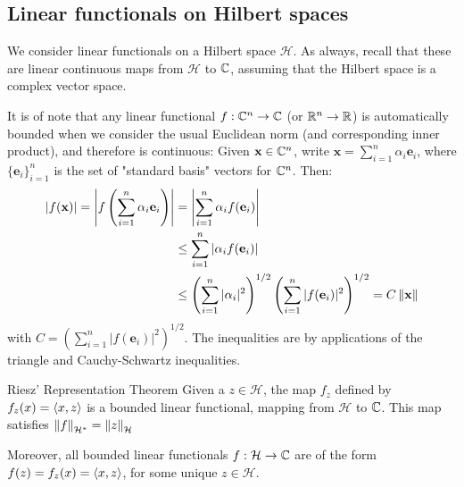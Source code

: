 \subsection{Linear functionals on Hilbert spaces}

We consider linear functionals on a Hilbert space $\mathcal{H}$. As always, recall that these are linear continuous maps from $\mathcal{H}$ to $\mathbb{C}$, assuming that the Hilbert space is a complex vector space.

It is of note that any linear functional $f: \mathbb{C}^{n} \to \mathbb{C}$ (or $\mathbb{R}^{n} \to \mathbb{R}$) is automatically bounded when we consider the usual Euclidean norm (and corresponding inner product), and therefore is continuous: Given $\mathbf{x}\in\mathbb{C}^{n}$, write $\mathbf{x} = \sum_{i=1}^{n}\alpha_{i} \mathbf{e}_{i}$, where $\{\mathbf{e}_{i} \}_{i=1}^{n}$ is the set of "standard basis" vectors for $\mathbb{C}^{n}$. Then:
\begin{equation}
    \begin{split}
        |f(\mathbf{x})| = \left| f\left( \sum_{i=1}^{n}\alpha_{i} \mathbf{e}_{i} \right) \right| &= \left| \sum_{i=1}^{n}\alpha_{i} f(\mathbf{e}_{i} ) \right| \\
        &\leq  \sum_{i=1}^{n}\left|\alpha_{i} f(\mathbf{e}_{i} ) \right| \\
        &\leq \left( \sum_{i=1}^{n} |\alpha_{i}|^{2}  \right)^{1/2} \left( \sum_{i=1}^{n}  |f(\mathbf{e}_{i})|^{2} \right)^{1/2} = C \left\lVert \mathbf{x} \right\rVert
    \end{split}
\end{equation}
with \mbox{$C = \left(\sum_{i=1}^{n} |f(\mathbf{e}_{i})|^{2} \right)^{1/2}$}. The inequalities are by applications of the triangle and Cauchy-Schwartz inequalities.

\begin{btheorem}{Riesz' Representation Theorem}{}
Given a $z\in \mathcal{H}$, the map $f_{z}$ defined by \mbox{$f_{z}(x) = \left\langle x, z \right\rangle$} is a bounded linear functional, mapping from $\mathcal{H}$ to $\mathbb{C}$. This map satisfies $\left\lVert f \right\rVert_{\mathcal{H}^{*}} = \left\lVert z \right\rVert_{\mathcal{H}}$

Moreover, all bounded linear functionals $f: \mathcal{H} \to \mathbb{C}$ are of the form \mbox{$f(z) = f_{z}(x) = \left\langle x, z \right\rangle$,} for some unique $z\in\mathcal{H}$.
\end{btheorem}


